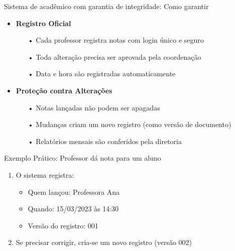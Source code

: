 \begin{frame}{Sistema de acadêmico com garantia de integridade: Como garantir}

    \begin{itemize}
      \item \textbf{Registro Oficial}
        \begin{itemize}
          \item[•] Cada professor registra notas com login único e seguro
          \item[•] Toda alteração precisa ser aprovada pela coordenação
          \item[•] Data e hora são registradas automaticamente
        \end{itemize}
      
      \item \textbf{Proteção contra Alterações}
        \begin{itemize}
          \item[•] Notas lançadas não podem ser apagadas
          \item[•] Mudanças criam um novo registro (como versão de documento)
          \item[•] Relatórios mensais são conferidos pela diretoria
        \end{itemize}
    \end{itemize}


  \begin{exampleblock}{Exemplo Prático: Professor dá nota para um aluno}
    \begin{enumerate}
      \item O sistema registra:
      \begin{itemize}
        \item Quem lançou: Professora Ana
        \item Quando: 15/03/2023 às 14:30
        \item Versão do registro: 001
      \end{itemize}
      \item Se precisar corrigir, cria-se um novo registro (versão 002)
    \end{enumerate}
  \end{exampleblock}
\end{frame}

